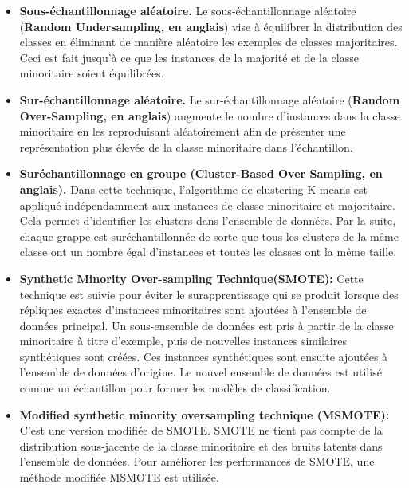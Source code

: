 \documentclass[12pt, french]{report}
\begin{document}
\begin{itemize}
\item \textbf{Sous-échantillonnage aléatoire.} Le sous-échantillonnage aléatoire (\textbf{Random Undersampling, en anglais})  vise à équilibrer la distribution des classes en éliminant de manière aléatoire les exemples de classes majoritaires. Ceci est fait jusqu'à ce que les instances de la majorité et de la classe minoritaire soient équilibrées.
\item \textbf{Sur-échantillonnage aléatoire.} Le sur-échantillonnage aléatoire (\textbf{Random Over-Sampling, en anglais}) augmente le nombre d'instances dans la classe minoritaire en les reproduisant aléatoirement afin de présenter une représentation plus élevée de la classe minoritaire dans l'échantillon.
\item \textbf{Suréchantillonnage en groupe (Cluster-Based Over Sampling, en anglais).}
Dans cette technique, l'algorithme de clustering K-means est appliqué indépendamment aux instances de classe minoritaire et majoritaire. Cela permet d'identifier les clusters dans l'ensemble de données. Par la suite, chaque grappe est suréchantillonnée de sorte que tous les clusters de la même classe ont un nombre égal d'instances et toutes les classes ont la même taille.
\item \textbf{Synthetic Minority Over-sampling Technique(SMOTE):}
Cette technique est suivie pour éviter le surapprentissage qui se produit lorsque des répliques exactes d'instances minoritaires sont ajoutées à l'ensemble de données principal. Un sous-ensemble de données est pris à partir de la classe minoritaire à titre d'exemple, puis de nouvelles instances similaires synthétiques sont créées. Ces instances synthétiques sont ensuite ajoutées à l'ensemble de données d'origine. Le nouvel ensemble de données est utilisé comme un échantillon pour former les modèles de classification.
\item \textbf{Modified synthetic minority oversampling technique (MSMOTE):}
C'est une version modifiée de SMOTE. SMOTE ne tient pas compte de la distribution sous-jacente de la classe minoritaire et des bruits latents dans l'ensemble de données. Pour améliorer les performances de SMOTE, une méthode modifiée MSMOTE est utilisée.
\end{itemize}
\end{document}
